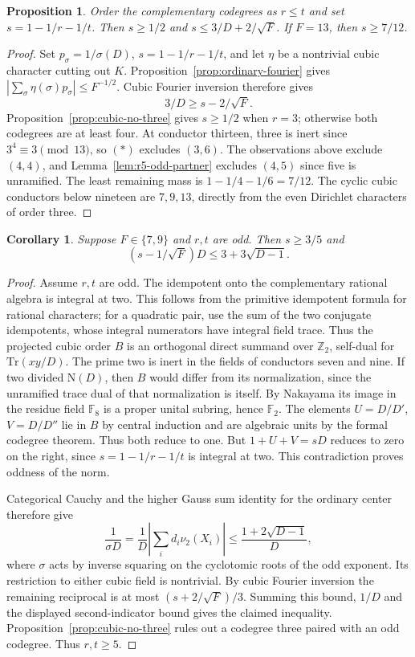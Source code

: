 \documentclass[11pt,a4paper]{article}
\newtheorem{proposition}[theorem]{Proposition}
\newtheorem{corollary}[theorem]{Corollary}
\numberwithin{equation}{section}
\begin{document}
\begin{proposition}\label{prop:r5-cubic-frontier}
Order the complementary codegrees as $r\le t$ and set $s=1-1/r-1/t$.
Then $s\ge1/2$ and $s\le 3/D+2/\sqrt F$. If $F=13$, then $s\ge7/12$.
\end{proposition}
\begin{proof}
Set $p_\sigma=1/\sigma(D)$, $s=1-1/r-1/t$, and let $\eta$ be a nontrivial
cubic character cutting out $K$. Proposition~\ref{prop:ordinary-fourier}
gives $|\sum_\sigma\eta(\sigma)p_\sigma|\le F^{-1/2}$.
Cubic Fourier inversion therefore gives
\[
                     3/D\ge s-2/\sqrt F .
\]
Proposition~\ref{prop:cubic-no-three} gives $s\ge1/2$ when $r=3$; otherwise both codegrees are at least four. At conductor thirteen, three is inert since $3^4\equiv3\pmod{13}$, so $(*)$ excludes $(3,6)$. The observations above exclude $(4,4)$, and Lemma~\ref{lem:r5-odd-partner} excludes $(4,5)$ since five is unramified. The least remaining mass is $1-1/4-1/6=7/12$. The cyclic cubic conductors below nineteen are $7,9,13$, directly from the even Dirichlet characters of order three.
\end{proof}

\begin{corollary}\label{cor:r5-cubic-even}
Suppose $F\in\{7,9\}$ and $r,t$ are odd. Then $s\ge3/5$ and
\[
              (s-1/\sqrt F)D\le3+3\sqrt{D-1}.
\]
\end{corollary}
\begin{proof}
Assume $r,t$ are odd. The idempotent onto the complementary
rational algebra is integral at two. This follows from the
primitive idempotent formula for rational characters; for a
quadratic pair, use the sum of the two conjugate idempotents,
whose integral numerators have integral field trace. Thus the
projected cubic order $B$ is an orthogonal direct summand over
$\mathbb Z_2$, self-dual for $\mathrm{Tr}(xy/D)$. The prime two
is inert in the fields of conductors seven and nine.
If two divided $\mathrm N(D)$, then $B$ would differ from its
normalization, since the unramified trace dual of that normalization
is itself. By Nakayama its image in the residue field
$\mathbb F_8$ is a proper unital subring, hence $\mathbb F_2$.
The elements $U=D/D'$, $V=D/D''$ lie in $B$ by central induction
and are algebraic units by the formal codegree theorem. Thus both
reduce to one. But $1+U+V=sD$ reduces to zero on the right, since
$s=1-1/r-1/t$ is integral at two. This contradiction proves oddness
of the norm.

Categorical Cauchy and the higher Gauss sum identity for the ordinary
center therefore give
\[
 \frac1{\sigma D}
  =\frac{1}{D}\left|\sum_i d_i\nu_2(X_i)\right|
  \le \frac{1+2\sqrt{D-1}}{D},
\]
where $\sigma$ acts by inverse squaring on the cyclotomic roots
of the odd exponent. Its restriction to either cubic field is nontrivial.
By cubic Fourier inversion the remaining reciprocal is at most $(s+2/\sqrt F)/3$. Summing this bound, $1/D$ and the displayed second-indicator bound gives the claimed inequality. Proposition~\ref{prop:cubic-no-three} rules out a codegree three paired with an odd codegree. Thus $r,t\ge5$.
\end{proof}
\end{document}
